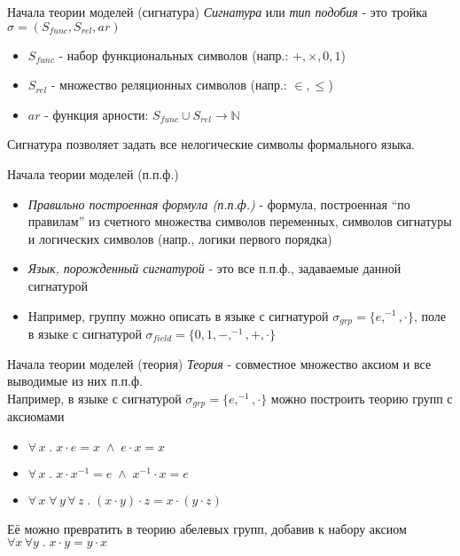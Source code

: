 \documentclass{beamer}
\begin{document}
\begin{frame}{Начала теории моделей (сигнатура)}
  \textit{Сигнатура} или \textit{тип подобия} - это тройка $\sigma = (S_{func}, S_{rel}, ar)$\\
  \bigskip
  \begin{itemize}
    \item $S_{func}$ - набор функциональных символов (напр.: $+, \times, 0, 1$)
    \item $S_{rel}$ - множество реляционных символов (напр.: $\in, \leq$)
    \item $ar$ - функция арности: $S_{func} \cup S_{rel} \to \mathbb{N}$
  \end{itemize}
  \bigskip
  Сигнатура позволяет задать все нелогические символы формального языка.
\end{frame}

\begin{frame}{Начала теории моделей (п.п.ф.)}
  \begin{itemize}
    \item \textit{Правильно построенная формула (п.п.ф.)} - формула, построенная ``по правилам'' из счетного множества символов переменных, символов сигнатуры и логических символов (напр., логики первого порядка)
    \item \textit{Язык, порожденный сигнатурой} - это все п.п.ф., задаваемые данной сигнатурой
    \item Например, группу можно описать в языке с сигнатурой $\sigma_{grp} = \{e, ^{-1}, \cdot\}$, поле в языке с сигнатурой $\sigma_{field} = \{0, 1, -, ^{-1}, +, \cdot\}$
  \end{itemize}
\end{frame}

\begin{frame}{Начала теории моделей (теория)}
\textit{Теория} - совместное множество аксиом и все выводимые из них п.п.ф.\\
\bigskip
Например, в языке с сигнатурой $\sigma_{grp} = \{e, ^{-1}, \cdot\}$ можно построить теорию групп с аксиомами\\
  \begin{itemize}
    \item $\forall \, x \; . \; x \cdot e = x \; \wedge \; e \cdot x = x$ 
    \item $\forall \, x \; . \;x \cdot x^{-1} = e \; \wedge \; x^{-1} \cdot x = e$ 
    \item $\forall \, x \; \forall \, y \, \forall \, z \; . \; (x \cdot y) \cdot z = x \cdot (y \cdot z)$
  \end{itemize}
Её можно превратить в теорию абелевых групп, добавив к набору аксиом $\forall x \, \forall y \; . \; x \cdot y = y \cdot x$
\end{frame}
\end{document}
